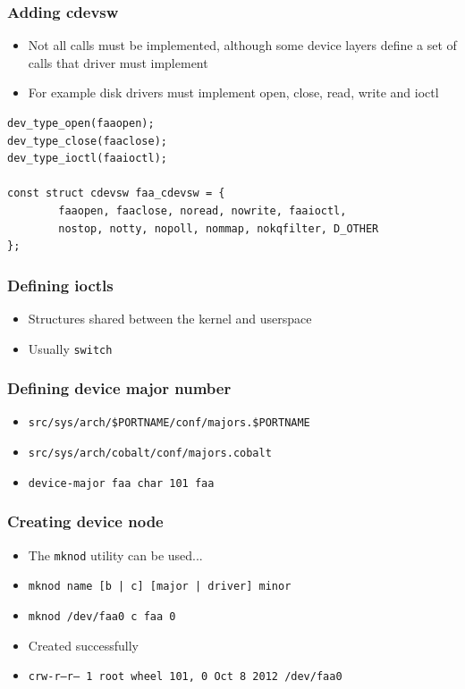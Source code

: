 \documentclass[dvipsnames,table]{beamer}
\begin{document}
\begin{frame}[fragile]
\frametitle{Adding cdevsw}
\begin{itemize}
	\item Not all calls must be implemented, although some device layers define a set of calls that driver must implement
	\item For example disk drivers must implement open, close, read, write and ioctl
\end{itemize}
\begin{lstlisting}
dev_type_open(faaopen);
dev_type_close(faaclose);
dev_type_ioctl(faaioctl);

const struct cdevsw faa_cdevsw = {
        faaopen, faaclose, noread, nowrite, faaioctl,
        nostop, notty, nopoll, nommap, nokqfilter, D_OTHER
};
\end{lstlisting}
\end{frame}

\begin{frame}
\frametitle{Defining ioctls}
\begin{itemize}
	\item Structures shared between the kernel and userspace
	\item Usually {\tt switch}
\end{itemize}
\end{frame}

\begin{frame}
\frametitle{Defining device major number}
\begin{itemize}
	\item {\tt src/sys/arch/\$PORTNAME/conf/majors.\$PORTNAME}
	\item {\tt src/sys/arch/cobalt/conf/majors.cobalt}
	\item {\tt device-major faa char 101 faa}
\end{itemize}
\end{frame}

\begin{frame}
\frametitle{Creating device node}
\begin{itemize}
	\item The {\tt mknod} utility can be used...
	\item {\tt mknod name [b | c] [major | driver] minor}
	\item {\tt mknod /dev/faa0 c faa 0}
	\item Created successfully
	\scriptsize
	\item {\tt crw-r--r--  1 root  wheel  101, 0 Oct  8  2012 /dev/faa0}
	\normalsize
\end{itemize}
\end{frame}
\end{document}
